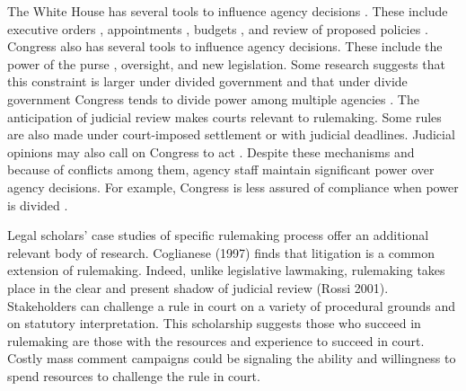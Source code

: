 % 


The White House has several tools to influence agency decisions \citep{Yackee2009a,Simon1954}. These include executive orders \citep{Mayer1999}, appointments \citep{Doherty2014,Lewis2008,Wood1988}, budgets \citep{Whittington2003}, and review of proposed policies \citep{Haeder2015, Acs2013}. 
Congress also has several tools to influence agency decisions. These include the power of the purse \citep{Fenno1986,Bolton2015}, oversight, and new legislation. Some research suggests that this constraint is larger under divided government \citep{Yackee2009RegGov} %
and that under divide government Congress tends to divide power among multiple agencies \citep{Farhang2016}.
The anticipation of judicial review makes courts relevant to rulemaking. Some rules are also made under court-imposed settlement or with judicial deadlines. Judicial opinions may also call on Congress to act \citep{Yaver2017}.
Despite these mechanisms and because of conflicts among them, agency staff maintain significant power over agency decisions. For example, Congress is less assured of compliance when power is divided \citep{Yaver2016}.

Legal scholars' case studies of specific rulemaking process offer an additional relevant body of research. Coglianese (1997) finds that litigation is a common extension of rulemaking. Indeed, unlike legislative lawmaking, rulemaking takes place in the clear and present shadow of judicial review (Rossi 2001). Stakeholders can challenge a rule in court on a variety of procedural grounds and on statutory interpretation. This scholarship suggests those who succeed in rulemaking are those with the resources and experience to succeed in court. Costly mass comment campaigns could be signaling the ability and willingness to spend resources to challenge the rule in court. 

